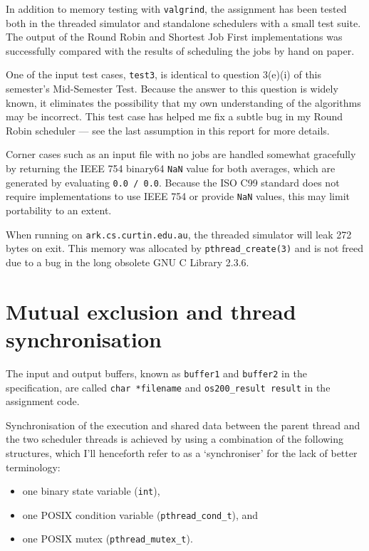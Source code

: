 \documentclass[a4paper,12pt,titlepage]{article}
\begin{document}
In addition to memory testing with \texttt{valgrind}, the assignment has been
tested both in the threaded simulator and standalone schedulers with a small
test suite. The output of the Round Robin and Shortest Job First
implementations was successfully compared with the results of scheduling the
jobs by hand on paper.

One of the input test cases, \texttt{test3}, is identical to question 3(e)(i)
of this semester's Mid-Semester Test. Because the answer to this question is
widely known, it eliminates the possibility that my own understanding of the
algorithms may be incorrect. This test case has helped me fix a subtle bug in
my Round Robin scheduler --- see the last assumption in this report for more
details.

Corner cases such as an input file with no jobs are handled somewhat gracefully
by returning the IEEE 754 binary64 \texttt{NaN} value for both averages, which
are generated by evaluating \texttt{0.0 / 0.0}. Because the ISO C99 standard
does not require implementations to use IEEE 754 or provide \texttt{NaN}
values, this may limit portability to an extent.

When running on \texttt{ark.cs.curtin.edu.au}, the threaded simulator will leak
272 bytes on exit. This memory was allocated by \texttt{pthread\_create(3)} and
is not freed due to a bug in the long obsolete GNU C Library 2.3.6.

\newpage

\section{Mutual exclusion and thread synchronisation}

The input and output buffers, known as \texttt{buffer1} and \texttt{buffer2}
in the specification, are called \texttt{char *filename} and
\texttt{os200\_result result} in the assignment code.

Synchronisation of the execution and shared data between the parent thread and
the two scheduler threads is achieved by using a combination of the following
structures, which I'll henceforth refer to as a `synchroniser' for the lack of
better terminology:

\begin{itemize}
	\item one binary state variable (\texttt{int}),
	\item one POSIX condition variable (\texttt{pthread\_cond\_t}), and
	\item one POSIX mutex (\texttt{pthread\_mutex\_t}).
\end{itemize}
\end{document}
